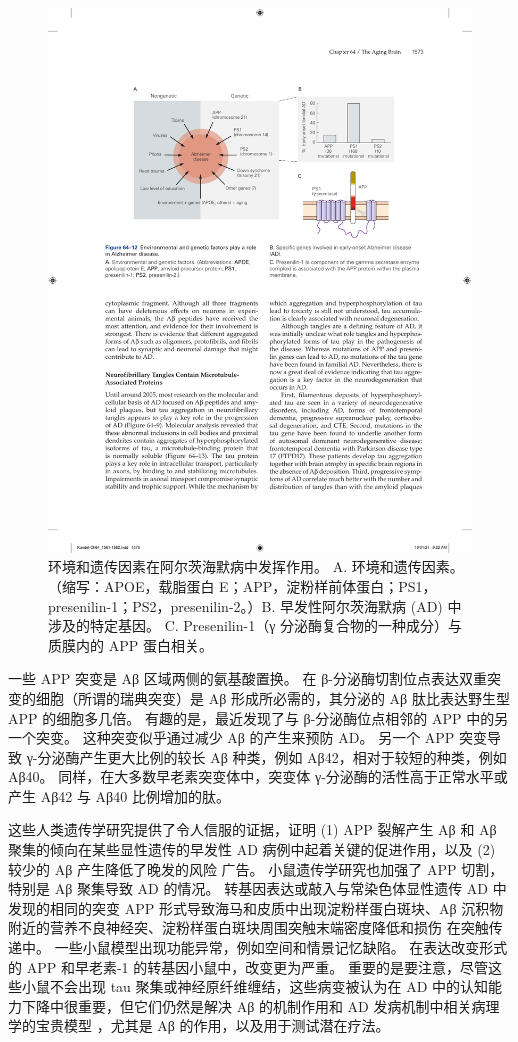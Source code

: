 \begin{figure}[htbp]
	\centering
	\includegraphics[width=0.8\linewidth]{chap64/fig_64_12}
	\caption{环境和遗传因素在阿尔茨海默病中发挥作用。 A. 环境和遗传因素。 （缩写：APOE，载脂蛋白 E；APP，淀粉样前体蛋白；PS1，presenilin-1；PS2，presenilin-2。）B. 早发性阿尔茨海默病 (AD) 中涉及的特定基因。 C. Presenilin-1（γ 分泌酶复合物的一种成分）与质膜内的 APP 蛋白相关。}
	\label{fig:64_12}
\end{figure}


一些 APP 突变是 Aβ 区域两侧的氨基酸置换。
在 β-分泌酶切割位点表达双重突变的细胞（所谓的瑞典突变）是 Aβ 形成所必需的，其分泌的 Aβ 肽比表达野生型 APP 的细胞多几倍。
有趣的是，最近发现了与 β-分泌酶位点相邻的 APP 中的另一个突变。
这种突变似乎通过减少 Aβ 的产生来预防 AD。 另一个 APP 突变导致 γ-分泌酶产生更大比例的较长 Aβ 种类，例如 Aβ42，相对于较短的种类，例如 Aβ40。
同样，在大多数早老素突变体中，突变体 γ-分泌酶的活性高于正常水平或产生 Aβ42 与 Aβ40 比例增加的肽。


这些人类遗传学研究提供了令人信服的证据，证明 (1) APP 裂解产生 Aβ 和 Aβ 聚集的倾向在某些显性遗传的早发性 AD 病例中起着关键的促进作用，以及 (2) 较少的 Aβ 产生降低了晚发的风险 广告。
小鼠遗传学研究也加强了 APP 切割，特别是 Aβ 聚集导致 AD 的情况。
转基因表达或敲入与常染色体显性遗传 AD 中发现的相同的突变 APP 形式导致海马和皮质中出现淀粉样蛋白斑块、Aβ 沉积物附近的营养不良神经突、淀粉样蛋白斑块周围突触末端密度降低和损伤 在突触传递中。
一些小鼠模型出现功能异常，例如空间和情景记忆缺陷。
在表达改变形式的 APP 和早老素-1 的转基因小鼠中，改变更为严重。
重要的是要注意，尽管这些小鼠不会出现 tau 聚集或神经原纤维缠结，这些病变被认为在 AD 中的认知能力下降中很重要，但它们仍然是解决 Aβ 的机制作用和 AD 发病机制中相关病理学的宝贵模型 ，尤其是 Aβ 的作用，以及用于测试潜在疗法。


